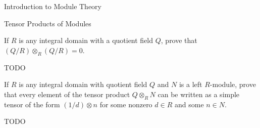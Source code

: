 \begin{chapter}{Introduction to Module Theory}
\begin{section}{Tensor Products of Modules}
\begin{solution}
\end{solution}\oneperpage



\begin{problem}\label{ex:10.4.6}
If $R$ is any integral domain with a quotient field $Q$, prove that $(Q/R)\otimes_R(Q/R) = 0$.
\end{problem}
\begin{solution}TODO

\end{solution}\oneperpage



\begin{problem}\label{ex:10.4.7}
If $R$ is any integral domain with quotient field $Q$ and $N$ is a left $R$-module, prove that every element of the tensor product $Q\otimes_R N$ can be written as a simple tensor of the form $(1/d)\otimes n$ for some nonzero $d\in R$ and some $n\in N$. 
\end{problem}
\begin{solution}TODO

\end{solution}\oneperpage




\end{section}
\end{chapter}
